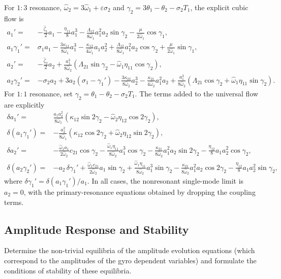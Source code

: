 \documentclass[11pt]{article}
\newenvironment{assignmentinstruction}{\par\begingroup\color{blue}}{\par\endgroup}
\begin{document}
For $1{:}3$ resonance, $\hat{\omega}_2=3\hat{\omega}_1+\varepsilon\sigma_2$ and $\gamma_2=3\theta_1-\theta_2-\sigma_2T_1$, the explicit cubic flow is
\begin{align}
a_1'={}&-\frac{\hat{\zeta}_1}{2}a_1-\frac{\eta_{11}}{8}a_1^3-\frac{\Lambda_{12}}{8\hat{\omega}_1}a_1^2a_2\sin\gamma_2-\frac{\mu}{2\hat{\omega}_1}\cos\gamma_1,\nonumber\\
a_1\gamma_1'={}&\sigma_1a_1-\frac{3\kappa_{11}}{8\hat{\omega}_1}a_1^3-\frac{\kappa_{12}}{4\hat{\omega}_1}a_1a_2^2+\frac{\Lambda_{12}}{8\hat{\omega}_1}a_1^2a_2\cos\gamma_2+\frac{\mu}{2\hat{\omega}_1}\sin\gamma_1,\nonumber\\
a_2'={}&-\frac{\hat{\zeta}_2}{2}a_2+\frac{a_1^3}{8\hat{\omega}_2}(\Lambda_{21}\sin\gamma_2-\hat{\omega}_1\eta_{11}\cos\gamma_2),\nonumber\\
a_2\gamma_2'={}&-\sigma_2a_2+3a_2(\sigma_1-\gamma_1')-\frac{3\kappa_{22}}{8\hat{\omega}_2}a_2^3-\frac{\kappa_{21}}{4\hat{\omega}_2}a_1^2a_2
+\frac{a_1^3}{8\hat{\omega}_2}(\Lambda_{21}\cos\gamma_2+\hat{\omega}_1\eta_{11}\sin\gamma_2).\label{eq:slowflow-13}
\end{align}
For $1{:}1$ resonance, set $\gamma_2=\theta_1-\theta_2-\sigma_2T_1$. The terms added to the universal flow are explicitly
\begin{align*}
\delta a_1'={}&\frac{a_1a_2^2}{8\hat{\omega}_1}(\kappa_{12}\sin2\gamma_2-\hat{\omega}_2\eta_{12}\cos2\gamma_2),\\
\delta(a_1\gamma_1')={}&-\frac{a_2^2}{8\hat{\omega}_1}(\kappa_{12}\cos2\gamma_2+\hat{\omega}_2\eta_{12}\sin2\gamma_2),\\
\delta a_2'={}&-\frac{\hat{\omega}_1a_1}{2\hat{\omega}_2}c_{21}\cos\gamma_2-\frac{\hat{\omega}_1\eta_{11}}{8\hat{\omega}_2}a_1^3\cos\gamma_2-\frac{\kappa_{21}}{8\hat{\omega}_2}a_1^2a_2\sin2\gamma_2-\frac{\eta_{12}}{8}a_1a_2^2\cos\gamma_2,\\
\delta(a_2\gamma_2')={}&-a_2\,\delta\gamma_1'+\frac{\hat{\omega}_1c_{21}}{2\hat{\omega}_2}a_1\sin\gamma_2+\frac{\hat{\omega}_1\eta_{11}}{8\hat{\omega}_2}a_1^3\sin\gamma_2-\frac{\kappa_{21}}{8\hat{\omega}_2}a_1^2a_2\cos2\gamma_2-\frac{\eta_{12}}{8}a_1a_2^2\sin\gamma_2,
\end{align*}
where $\delta\gamma_1'=\delta(a_1\gamma_1')/a_1$. In all cases, the nonresonant single-mode limit is $a_2=0$, with the primary-resonance equations obtained by dropping the coupling terms.

\subsection{Amplitude Response and Stability}
\begin{assignmentinstruction}
Determine the non-trivial equilibria of the amplitude evolution equations (which correspond to the amplitudes of the gyro dependent variables) and formulate the conditions of stability of these equilibria.
\end{assignmentinstruction}
\end{document}
